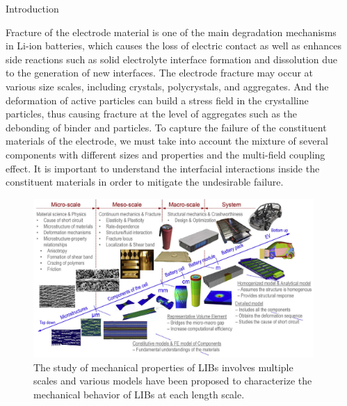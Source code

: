 \documentclass[final]{beamer}
\newlength{\sepwid}
\newlength{\onecolwid}
\begin{document}
\begin{frame}[t]
\begin{columns}[t]
\begin{column}{\onecolwid}
\begin{block}{Introduction}

Fracture of the electrode material is one of the main degradation
mechanisms in Li-ion batteries, which causes the loss of electric
contact as well as enhances side reactions such as solid electrolyte interface formation and dissolution due to the generation of new
interfaces. The electrode fracture may occur at various size scales, including crystals, polycrystals, and aggregates. And the deformation of
active particles can build a stress field in the crystalline
particles, thus
causing fracture at the level of aggregates such as the
debonding of binder and particles. To capture the failure of the constituent materials of the electrode, we must take into account
the mixture of several components with different sizes and properties and the multi-field coupling effect. It is important to understand the interfacial interactions inside the
constituent materials in order to mitigate the undesirable failure.\\
\end{block}

\begin{figure}
\includegraphics[width=0.8\linewidth]{zhu.png}
\caption{The study of mechanical properties of LIBs involves multiple scales and various models have been proposed to characterize the mechanical behavior of LIBs at each
length scale\cite{Zhu2018A}.}
\end{figure}


\end{column} %

\begin{column}{\sepwid}\end{column} %


\end{columns}
\end{frame}
\end{document}
